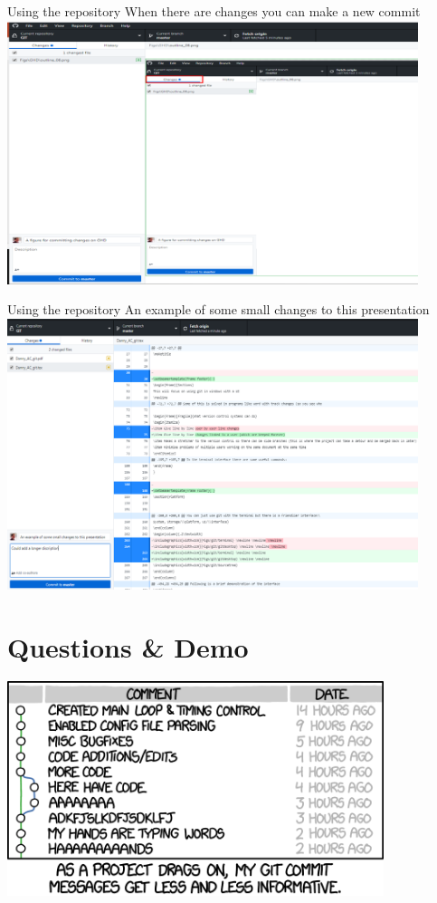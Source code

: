 \documentclass[10pt]{beamer}
\begin{document}
{\begin{frame}[fragile]{Using the repository}
\small When there are changes you can make a new commit
\includegraphics[width=12cm]{Figs/GHD/outline_08}
\end{frame}

\begin{frame}[fragile]{Using the repository}
\small An example of some small changes to this presentation
\includegraphics[width=12cm]{Figs/GHD/outline_10}
\end{frame}



\section{Questions \& Demo}



{%
{
\begin{frame}[standout]
\includegraphics[width=11cm]{Figs/xkcd_end}
\end{frame}
}


}}
\end{document}
